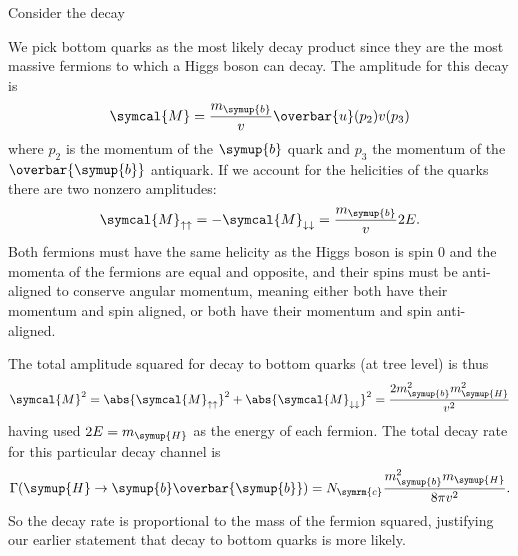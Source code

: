 \documentclass[fleqn]{NotesClass}
\newcommand{\Pparticle}[1]{\symup{#1}}
\newcommand{\Pb}{\ensuremath{\Pparticle{b}}}
\newcommand{\Phiggs}{\ensuremath{\Pparticle{H}}}
\newcommand{\APantiparticle}[1]{\overbar{#1}}
\newcommand{\APb}{\ensuremath{\APantiparticle{\Pparticle{b}}}}
\newcommand{\amplitude}{\symcal{M}}
\newcommand{\diracadjoint}[1]{\overbar{#1}}
\newcommand{\numberofcolors}{N_{\symrm{c}}}
\begin{document}
    Consider the decay
    We pick bottom quarks as the most likely decay product since they are the most massive fermions to which a Higgs boson can decay.
    The amplitude for this decay is
    \begin{equation}
        \amplitude = \frac{m_{\Pb}}{v} \diracadjoint{u}(p_2) v(p_3)
    \end{equation}
    where \(p_2\) is the momentum of the \(\Pb\) quark and \(p_3\) the momentum of the \(\APb\) antiquark.
    If we account for the helicities of the quarks there are two nonzero amplitudes:
    \begin{equation}
        \amplitude_{\uparrow\uparrow} = -\amplitude_{\downarrow\downarrow} = \frac{m_{\Pb}}{v}2E.
    \end{equation}
    Both fermions must have the same helicity as the Higgs boson is spin 0 and the momenta of the fermions are equal and opposite, and their spins must be anti-aligned to conserve angular momentum, meaning either both have their momentum and spin aligned, or both have their momentum and spin anti-aligned.
    
    The total amplitude squared for decay to bottom quarks (at tree level) is thus
    \begin{equation}
        \amplitude^2 = \abs{\amplitude_{\uparrow\uparrow}}^2 + \abs{\amplitude_{\downarrow\downarrow}}^2 = \frac{2m_{\Pb}^2m_{\Phiggs}^2}{v^2}
    \end{equation}
    having used \(2E = m_{\Phiggs}\) as the energy of each fermion.
    The total decay rate for this particular decay channel is
    \begin{equation}
        \Gamma(\Phiggs \to \Pb \APb) = \numberofcolors \frac{m_{\Pb}^2 m_{\Phiggs}}{8\pi v^2}.
    \end{equation}
    So the decay rate is proportional to the mass of the fermion squared, justifying our earlier statement that decay to bottom quarks is more likely.
    
\end{document}
